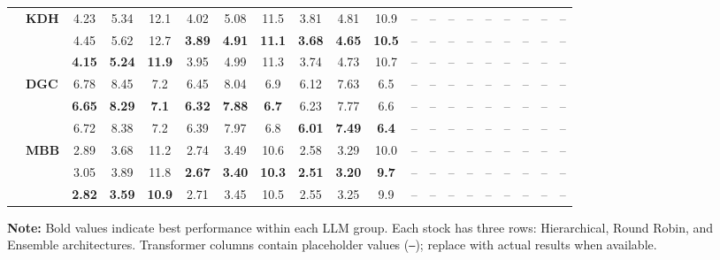\begin{table}[!t]
\begin{tabular*}{\textwidth}{@{\extracolsep{\fill}}llccc|ccc|ccc|ccc|ccc|ccc@{}}
& \multirow{3}{*}{\textbf{KDH}} 
  & 4.23 & 5.34 & 12.1 & 4.02 & 5.08 & 11.5 & 3.81 & 4.81 & 10.9
  & -- & -- & -- & -- & -- & -- & -- & -- & -- \\
& 
  & 4.45 & 5.62 & 12.7 & \textbf{3.89} & \textbf{4.91} & \textbf{11.1} & \textbf{3.68} & \textbf{4.65} & \textbf{10.5}
  & -- & -- & -- & -- & -- & -- & -- & -- & -- \\
& 
  & \textbf{4.15} & \textbf{5.24} & \textbf{11.9} & 3.95 & 4.99 & 11.3 & 3.74 & 4.73 & 10.7
  & -- & -- & -- & -- & -- & -- & -- & -- & -- \\
& \multirow{3}{*}{\textbf{DGC}} 
  & 6.78 & 8.45 & 7.2 & 6.45 & 8.04 & 6.9 & 6.12 & 7.63 & 6.5
  & -- & -- & -- & -- & -- & -- & -- & -- & -- \\
& 
  & \textbf{6.65} & \textbf{8.29} & \textbf{7.1} & \textbf{6.32} & \textbf{7.88} & \textbf{6.7} & 6.23 & 7.77 & 6.6
  & -- & -- & -- & -- & -- & -- & -- & -- & -- \\
& 
  & 6.72 & 8.38 & 7.2 & 6.39 & 7.97 & 6.8 & \textbf{6.01} & \textbf{7.49} & \textbf{6.4}
  & -- & -- & -- & -- & -- & -- & -- & -- & -- \\
& \multirow{3}{*}{\textbf{MBB}} 
  & 2.89 & 3.68 & 11.2 & 2.74 & 3.49 & 10.6 & 2.58 & 3.29 & 10.0
  & -- & -- & -- & -- & -- & -- & -- & -- & -- \\
& 
  & 3.05 & 3.89 & 11.8 & \textbf{2.67} & \textbf{3.40} & \textbf{10.3} & \textbf{2.51} & \textbf{3.20} & \textbf{9.7}
  & -- & -- & -- & -- & -- & -- & -- & -- & -- \\
& 
  & \textbf{2.82} & \textbf{3.59} & \textbf{10.9} & 2.71 & 3.45 & 10.5 & 2.55 & 3.25 & 9.9
  & -- & -- & -- & -- & -- & -- & -- & -- & -- \\

\bottomrule
\end{tabular*}

\vspace{0.3cm}
\footnotesize
\textbf{Note:} Bold values indicate best performance within each LLM group. Each stock has three rows: Hierarchical, Round Robin, and Ensemble architectures. Transformer columns contain placeholder values (\texttt{--}); replace with actual results when available.
\end{table}
